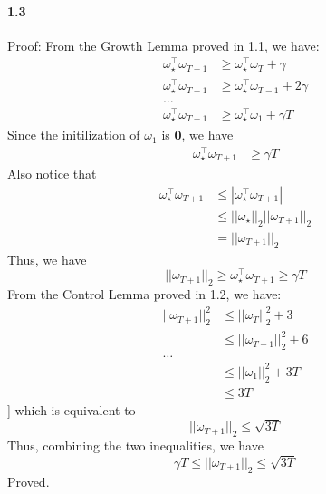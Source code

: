 \documentclass[11pt]{article}
\begin{document}
\paragraph{1.3}
Proof:
\newline
From the Growth Lemma proved in 1.1, we have:
\begin{equation}
  \begin{split}
    \omega_{\star}^\top\omega_{T+1} &\geq \omega_{\star}^\top\omega_T + \gamma \\
    \omega_{\star}^\top\omega_{T+1} &\geq \omega_{\star}^\top\omega_{T-1} + 2\gamma \\
    \ldots \\
    \omega_{\star}^\top\omega_{T+1} &\geq \omega_{\star}^\top\omega_1 + \gamma T
  \end{split}
\end{equation}
Since the initilization of $\omega_1$ is $\mathbf{0}$, we have
\begin{equation}
  \begin{split}
    \omega_{\star}^\top\omega_{T+1} &\geq \gamma T
  \end{split}
\end{equation}
Also notice that
\begin{equation}
  \begin{split}
    \omega_{\star}^\top\omega_{T+1} &\leq | \omega_{\star}^\top\omega_{T+1} | \\
    &\leq ||\omega_{\star}||_2 ||\omega_{T+1}||_2 \\ 
    &= ||\omega_{T+1}||_2
  \end{split}
\end{equation}
Thus, we have
\begin{equation}
  ||\omega_{T+1}||_2 \geq \omega_{\star}^\top\omega_{T+1} \geq \gamma T
\end{equation}
From the Control Lemma proved in 1.2, we have:
\begin{equation}
  \begin{split}
    ||\omega_{T+1}||_2^2 &\leq ||\omega_T||_2^2 + 3 \\
    &\leq ||\omega_{T-1}||_2^2 + 6 \\
    \ldots \\
    &\leq ||\omega_1||_2^2 + 3T \\
    &\leq 3T
  \end{split}
\end{equation}]
which is equivalent to
\begin{equation}
  ||\omega_{T+1}||_2 \leq \sqrt{3T}
\end{equation}
Thus, combining the two inequalities, we have
\begin{equation}
  \gamma T \leq ||\omega_{T+1}||_2 \leq \sqrt{3T}
\end{equation}
Proved.
\end{document}
